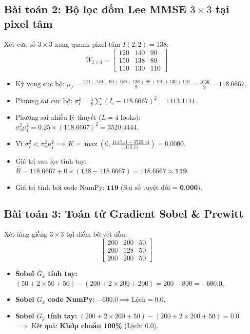 \subsection{Bài toán 2: Bộ lọc đốm Lee MMSE $3 \times 3$ tại pixel tâm}
Xét cửa sổ $3 \times 3$ xung quanh pixel tâm $I(2, 2) = 138$:
\begin{equation*}
W_{3 \times 3} = \begin{bmatrix} 120 & 140 & 90 \\ 150 & 138 & 80 \\ 110 & 130 & 110 \end{bmatrix}
\end{equation*}
\begin{itemize}
    \item Kỳ vọng cục bộ: $\mu_I = \frac{120+140+90+150+138+80+110+130+110}{9} = \frac{1068}{9} = 118.6667$.
    \item Phương sai cục bộ: $\sigma_I^2 = \frac{1}{9}\sum (I_i - 118.6667)^2 = 1113.1111$.
    \item Phương sai nhiễu lý thuyết ($L = 4$ looks): $\sigma_v^2 \mu_I^2 = 0.25 \times (118.6667)^2 = 3520.4444$.
    \item Vì $\sigma_I^2 < \sigma_v^2 \mu_I^2 \implies K = \max(0, \frac{1113.11 - 3520.44}{1113.11}) = 0.0000$.
    \item Giá trị sau lọc tính tay: $\hat{R} = 118.6667 + 0 \times (138 - 118.6667) = 118.6667 \approx \mathbf{119}$.
    \item Giá trị tính bởi code NumPy: $\mathbf{119}$ (Sai số tuyệt đối = \textbf{0.000}).
\end{itemize}

\subsection{Bài toán 3: Toán tử Gradient Sobel \& Prewitt}
Xét láng giềng $3 \times 3$ tại điểm bờ vết dầu:
\begin{equation*}
\begin{bmatrix} 200 & 200 & 50 \\ 200 & 128 & 50 \\ 200 & 200 & 50 \end{bmatrix}
\end{equation*}
\begin{itemize}
    \item \textbf{Sobel $G_x$ tính tay:} $(50+2\times 50+50) - (200+2\times 200+200) = 200 - 800 = -600.0$.
    \item \textbf{Sobel $G_x$ code NumPy:} $-600.0 \implies \text{Lệch} = \mathbf{0.0}$.
    \item \textbf{Sobel $G_y$ tính tay:} $(200+2\times 200+50) - (200+2\times 200+50) = 0.0$ \\
    \hspace*{0.5cm} $\implies$ Kết quả: \textbf{Khớp chuẩn 100\%} (Lệch: $\mathbf{0.0}$).
\end{itemize}

